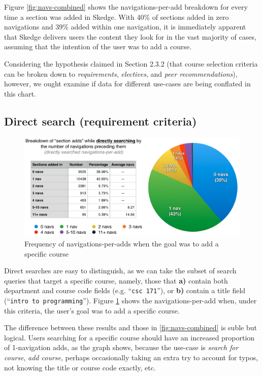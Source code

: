 Figure \ref{fig:navs-combined} shows the navigations-per-add breakdown for every time a section was added in Skedge. With 40\% of sections added in zero navigations and 39\% added within one navigation, it is immediately apparent that Skedge delivers users the content they look for in the vast majority of cases, assuming that the intention of the user was to add a course.

Considering the hypothesis claimed in Section 2.3.2 (that course selection criteria can be broken down to \emph{requirements}, \emph{electives}, and \emph{peer recommendations}), however, we ought examine if data for different use-cases are being conflated in this chart.

\subsection{Direct search (requirement criteria)}

  \begin{figure}
    \centering
    \includegraphics[width=1.0\textwidth]{images/graph/direct_navs}

    \caption{Frequency of navigations-per-adds when the goal was to add a specific course}
    \label{fig:navs-direct}
  \end{figure}

  Direct searches are easy to distinguish, as we can take the subset of search queries that target a specific course, namely, those that \textbf{a)} contain both department and course code fields (e.g. ``{\tt csc 171}''), or \textbf{b)} contain a title field (``{\tt intro to programming}''). Figure \ref{fig:navs-direct} shows the navigations-per-add when, under this criteria, the user's goal was to add a specific course.

  The difference between these results and those in \ref{fig:navs-combined} is suble but logical. Users searching for a specific course should have an increased proportion of 1-navigation adds, as the graph shows, because the use-case is \emph{search for course}, \emph{add course}, perhaps occasionally taking an extra try to account for typos, not knowing the title or course code exactly, etc.


